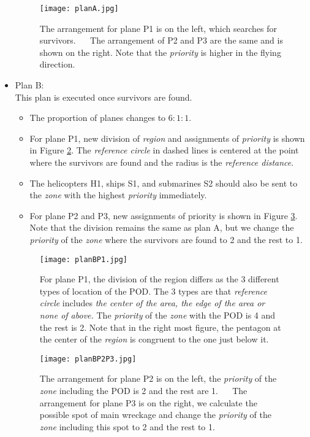 \documentclass[a4paper,11pt]{article}
\begin{document}
\begin{spacing}{1.0}
\begin{itemize}
\begin{itemize}
	\end{itemize}
	\begin{figure}[H]
		\centering
		\texttt{[image: planA.jpg]}
		\caption{The arrangement for plane P1 is on the left, which searches for survivors.  ~~ The arrangement of P2 and P3 are the same and is shown on the right. Note that the \textit{priority} is higher in the flying direction.}\label{plan A}
	\end{figure}



	\item Plan B: 
	\\This plan is executed once survivors are found. 
	\begin{itemize}
		\item The proportion of planes changes to $6:1:1$.
		\item For plane P1, new division of \textit{region} and assignments of \textit{priority} is shown in Figure \ref{planBP1}. The \textit{reference circle} in dashed lines is centered at the point where the survivors are found and the radius is the  \textit{reference distance}. 
		\item The helicopters H1, ships S1, and submarines S2 should also be sent to the \textit{zone} with the highest \textit{priority} immediately.
		\item For plane P2 and P3,  new assignments of priority is shown in Figure \ref{planBP2P3}. Note that the division remains the same as plan A, but we change the \textit{priority} of the \textit{zone} where the survivors are found to 2 and the rest to 1.
		
	\end{itemize}
	\begin{figure}[H]
		\centering
		\texttt{[image: planBP1.jpg]}
		\caption{For plane P1, the division of the region differs as the 3 different types of location of the POD. The 3 types are that \textit{reference circle} includes \textit{the center of the area, the edge of the area or none of above.} The \textit{priority} of the \textit{zone} with the POD is 4 and the rest is 2. Note that in the right most figure, the pentagon at the center  of the \textit{region} is congruent to the one just below it.}\label{planBP1}
		\end{figure}
		\begin{figure}[H]
		\centering
		\texttt{[image: planBP2P3.jpg]}
		\caption{The arrangement for plane P2 is on the left, the \textit{priority} of the \textit{zone} including the POD is 2 and the rest are 1. ~~ The arrangement for plane P3 is on the right, we calculate the possible spot of main wreckage and change the \textit{priority} of the \textit{zone} including this spot to 2 and the rest to 1.}\label{planBP2P3}
	\end{figure}
	

\end{itemize}
\end{spacing}
\end{document}
